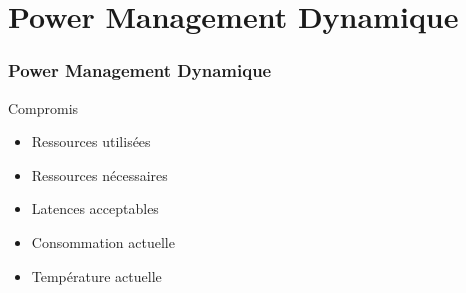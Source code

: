 \section{Power Management Dynamique}

\begin{frame}
	\frametitle{Power Management Dynamique}
	\begin{block}{Compromis}
	\begin{itemize}
		\item Ressources utilisées
		\item Ressources nécessaires
		\item Latences acceptables
		\item Consommation actuelle
		\item Température actuelle
	\end{itemize}
	\end{block}
\end{frame}

